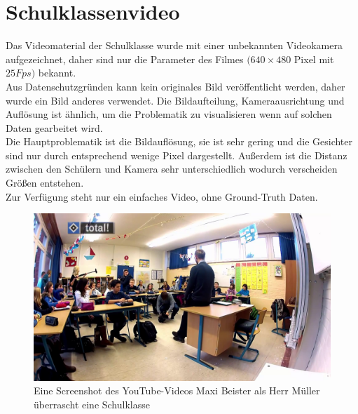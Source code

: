 \section{Schulklassenvideo}
Das Videomaterial der Schulklasse wurde mit einer unbekannten Videokamera aufgezeichnet, daher sind nur die Parameter des Filmes $(640 \times 480$ Pixel mit $25Fps)$ bekannt.\\
Aus Datenschutzgründen kann kein originales Bild veröffentlicht werden, daher wurde ein Bild anderes verwendet. Die Bildaufteilung, Kameraausrichtung und Auflösung ist ähnlich, um die Problematik zu visualisieren wenn auf solchen Daten gearbeitet wird.\\
Die Hauptproblematik ist die Bildauflösung, sie ist sehr gering und die Gesichter sind nur durch entsprechend wenige Pixel dargestellt. Außerdem ist die Distanz zwischen den Schülern und Kamera sehr unterschiedlich wodurch verscheiden Größen entstehen.\\
Zur Verfügung steht nur ein einfaches Video, ohne Ground-Truth Daten.
\begin{figure}
	\centering
	\includegraphics[width=0.7\linewidth]{img/Schulklasse}
	\caption{Eine Screenshot des YouTube-Videos \glqq Maxi Beister als Herr Müller überrascht eine Schulklasse\grqq \cite{Schulklasse_Video}}
	\label{fig:schulklasse}
\end{figure}

